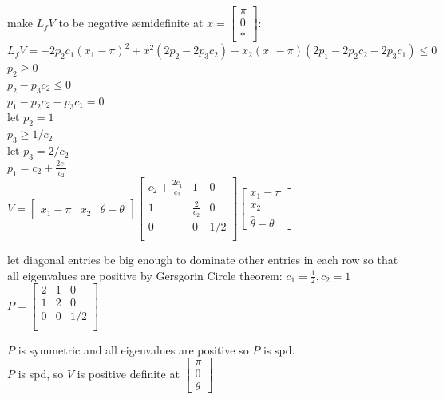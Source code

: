 \documentclass[12pt,letter]{article}
\begin{document}
\begin{itemize}
  make $L_fV$ to be negative semidefinite at
  $x=\begin{bmatrix}
    \pi\\
    0\\
    *
  \end{bmatrix}$:\\

  $L_fV = -2p_2c_1(x_1-\pi)^2+x^2(2p_2-2p_3c_2)+x_2(x_1-\pi)(2p_1-2p_2c_2-2p_3c_1) \leq 0$\\
  $p_2 \geq 0$\\
  $p_2 - p_3c_2 \leq 0$\\
  $p_1-p_2c_2-p_3c_1=0$\\

  let $p_2=1$\\
  $p_3 \geq 1/c_2$\\
  let $p_3=2/c_2$\\
  $p_1=c_2+\frac{2c_1}{c_2}$\\

  $V=
  \begin{bmatrix}
    x_1-\pi & x_2 & \hat{\theta}-\theta
  \end{bmatrix}
  \begin{bmatrix}
    c_2+\frac{2c_1}{c_2} & 1 & 0\\
    1 & \frac{2}{c_2} & 0\\
    0 & 0 & 1/2\\
  \end{bmatrix}
  \begin{bmatrix}
    x_1-\pi \\ x_2 \\ \hat{\theta}-\theta
  \end{bmatrix}
  $

  let diagonal entries be big enough to dominate other entries in each row so that all eigenvalues are positive by Gersgorin Circle theorem: $c_1=\frac{1}{2}, c_2=1$\\
  
  $P=
  \begin{bmatrix}
    2 & 1 & 0\\
    1 & 2 & 0\\
    0 & 0 & 1/2\\
  \end{bmatrix}
  $

  $P$ is symmetric and all eigenvalues are positive so $P$ is spd.\\

  $P$ is spd, so $V$ is positive definite at 
  $\begin{bmatrix}
    \pi \\ 0 \\ \theta
  \end{bmatrix}$\\


\end{itemize}
\end{document}
